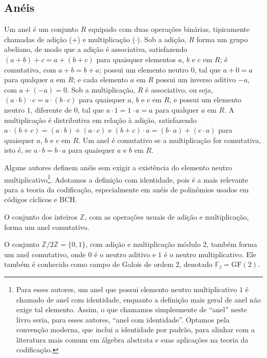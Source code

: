 \subsection{Anéis}

\begin{definition}[Anel]
Um anel é um conjunto $R$ equipado com duas operações binárias, tipicamente
chamadas de adição ($+$) e multiplicação ($\cdot$). Sob a adição, $R$ forma um
grupo abeliano, de modo que a adição é associativa, satisfazendo 
$(a + b) + c = a + (b + c)$ para quaisquer elementos $a$, $b$ e $c$ em $R$;
é comutativa, com $a + b = b + a$; possui um elemento neutro $0$, tal que
$a + 0 = a$ para qualquer $a$ em $R$; e cada elemento $a$ em $R$ possui um inverso
aditivo $-a$, com $a + (-a) = 0$. Sob a multiplicação, $R$ é associativo, ou seja, 
$(a \cdot b) \cdot c = a \cdot (b \cdot c)$ para quaisquer $a$, $b$ e $c$ em $R$, e
possui um elemento neutro $1$, diferente de $0$, tal que $a \cdot 1 = 1 \cdot a
= a$ para qualquer $a$ em $R$. A multiplicação é distributiva em relação à
adição, satisfazendo $a \cdot (b + c) = (a \cdot b) + (a \cdot c)$ e $(b + c)
\cdot a = (b \cdot a) + (c \cdot a)$ para quaisquer $a$, $b$ e $c$ em $R$. Um
anel é comutativo se a multiplicação for comutativa, isto é, se $a \cdot b = b
\cdot a$ para quaisquer $a$ e $b$ em $R$.
\end{definition}


Alguns autores definem anéis sem exigir a existência do elemento neutro
multiplicativo\footnote{Para esses autores, um anel que possui elemento
  neutro multiplicativo $1$ é chamado de anel com identidade, enquanto
  a definição mais geral de anel não exige tal elemento. Assim, o que chamamos
  simplesmente de ``anel'' neste livro seria, para esses autores, ``anel com
  identidade''. Optamos pela convenção moderna, que inclui a identidade por
  padrão, para alinhar com a literatura mais comum em álgebra abstrata e suas
  aplicações na teoria da codificação.}. Adotamos a definição com identidade,
pois é a mais relevante para a teoria da codificação, especialmente em anéis de
polinômios usados em códigos cíclicos e BCH.


\begin{example}
O conjunto dos inteiros $\mathbb{Z}$, com as operações usuais de adição e
multiplicação, forma um anel comutativo.
\end{example}

\begin{example}
O conjunto $\mathbb{Z}/2\mathbb{Z} = \{0, 1\}$, com adição e multiplicação
módulo 2, também forma um anel comutativo, onde $0$ é o neutro aditivo e $1$ é
o neutro multiplicativo. Ele também é conhecido como campo de Galois de ordem 2, denotado $\mathbb{F}₂ = \text{GF}(2)$.
\end{example}

